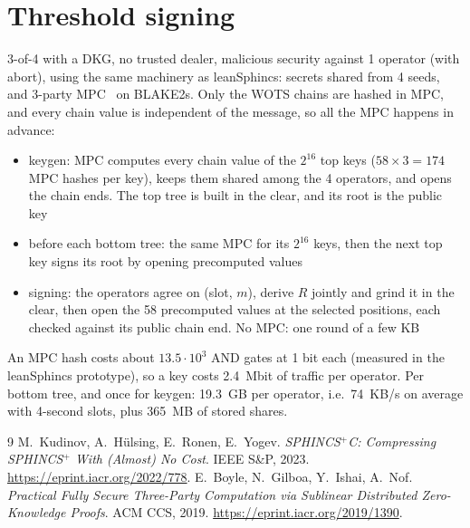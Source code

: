 \documentclass[11pt]{article}
\begin{document}
\section{Threshold signing}

3-of-4 with a DKG, no trusted dealer, malicious security against 1 operator (with abort), using the same
machinery as leanSphincs: secrets shared from 4 seeds, and 3-party MPC~\cite{BGIN19} on BLAKE2s. Only the
WOTS chains are hashed in MPC, and every chain value is independent of the message, so all the MPC
happens in advance:
\begin{itemize}
  \item keygen: MPC computes every chain value of the $2^{16}$ top keys ($58\times3=174$ MPC hashes per
        key), keeps them shared among the 4 operators, and opens the chain ends. The top tree is built in
        the clear, and its root is the public key
  \item before each bottom tree: the same MPC for its $2^{16}$ keys, then the next top key signs its root
        by opening precomputed values
  \item signing: the operators agree on (slot, $m$), derive $R$ jointly and grind it in the clear, then
        open the 58 precomputed values at the selected positions, each checked against its public chain
        end. No MPC: one round of a few KB
\end{itemize}
An MPC hash costs about $13.5\cdot10^3$ AND gates at 1 bit each (measured in the leanSphincs prototype),
so a key costs 2.4~Mbit of traffic per operator. Per bottom tree, and once for keygen: 19.3~GB per operator,
i.e.\ 74~KB/s on average with 4-second slots, plus 365~MB of stored shares.

\begin{thebibliography}{9}
 M.~Kudinov, A.~H\"ulsing, E.~Ronen, E.~Yogev. \emph{SPHINCS$^+$C: Compressing SPHINCS$^+$
  With (Almost) No Cost}. IEEE S\&P, 2023. \url{https://eprint.iacr.org/2022/778}.
 E.~Boyle, N.~Gilboa, Y.~Ishai, A.~Nof. \emph{Practical Fully Secure Three-Party
  Computation via Sublinear Distributed Zero-Knowledge Proofs}. ACM CCS, 2019.
  \url{https://eprint.iacr.org/2019/1390}.
\end{thebibliography}
\end{document}
